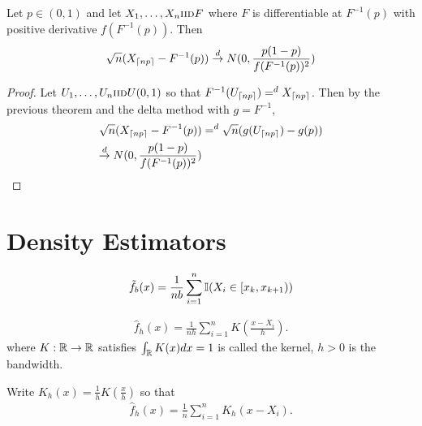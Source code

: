 \begin{thm}
  Let $p \in (0, 1)$ and let $X_{1}, \dots, X_{n} \textsc{iid} F$ where $F$ is
  differentiable at $F^{-1}(p)$ with positive derivative
  $f(F^{-1}(p))$.  Then
  \begin{align}
    \label{eq:141}
    \sqrt{n}(X_{\upperbound{np}} - F^{-1}(p)) \cd N(0, \frac{p(1-p)}{f(F^{-1}(p))^{2}} )
  \end{align}
\end{thm}

\begin{proof}
  Let $U_{1}, \dots, U_{n} \textsc{iid} U(0, 1)$ so that
  $F^{-1}(U_{\upperbound{np}}) =^{d} X_{\upperbound{np}}$.  Then by
  the previous theorem and the delta method with $g = F^{-1}$,
  \begin{align}
    \label{eq:142}
    \sqrt{n} (X_{\upperbound{np}} - F^{-1}(p)) &=^{d}
    \sqrt{n}(g(U_{\upperbound{np}}) - g(p)) \\
    \label{eq:143}
    \cd N(0, \frac{p(1-p)}{f(F^{-1}(p))^{2}} )
  \end{align}
\end{proof}

\section{Density Estimators}
\label{sec:density-estimators}

\begin{defn}
  \label{sec:density-estimators-1}
  \begin{align}
    \label{eq:144}
    \tilde f_{b}(x) = \frac{1}{nb} \sum_{i=1}^{n} \I{X_{i} \in [x_{k},
      x_{k+1})}
  \end{align}
\end{defn}

\begin{defn}
  \label{sec:density-estimators-2}
  \begin{align}
    \label{eq:145}
    \hat f_{h}(x) = \frac{1}{nh} \sum_{i=1}^{n} K(\frac{x - X_{i}}{h}).
  \end{align} where $K: \mathbb{R} \rightarrow \mathbb{R}$ satisfies $\int_{\mathbb{R}} K(x)
  dx = 1$ is called the kernel, $h > 0$ is the bandwidth.

  Write $K_{h}(x) = \frac{1}{h} K(\frac{x}{h})$ so that
  \begin{align}
    \label{eq:146}
    \hat f_{h}(x) = \frac{1}{n} \sum_{i=1}^{n} K_{h}(x - X_{i}).
  \end{align}
\end{defn}

